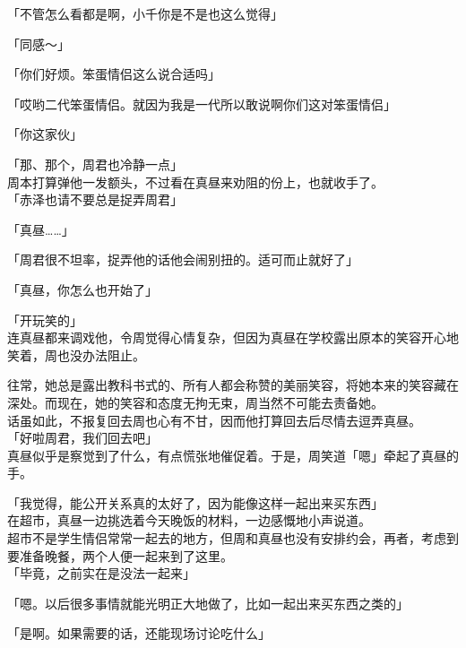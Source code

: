 「不管怎么看都是啊，小千你是不是也这么觉得」

「同感～」

「你们好烦。笨蛋情侣这么说合适吗」

「哎哟二代笨蛋情侣。就因为我是一代所以敢说啊你们这对笨蛋情侣」

「你这家伙」

「那、那个，周君也冷静一点」\\

周本打算弹他一发额头，不过看在真昼来劝阻的份上，也就收手了。\\

「赤泽也请不要总是捉弄周君」

「真昼……」

「周君很不坦率，捉弄他的话他会闹别扭的。适可而止就好了」

「真昼，你怎么也开始了」

「开玩笑的」\\

连真昼都来调戏他，令周觉得心情复杂，但因为真昼在学校露出原本的笑容开心地笑着，周也没办法阻止。

往常，她总是露出教科书式的、所有人都会称赞的美丽笑容，将她本来的笑容藏在深处。而现在，她的笑容和态度无拘无束，周当然不可能去责备她。\\

话虽如此，不报复回去周也心有不甘，因而他打算回去后尽情去逗弄真昼。\\

「好啦周君，我们回去吧」\\

真昼似乎是察觉到了什么，有点慌张地催促着。于是，周笑道「嗯」牵起了真昼的手。\\

\vspace{2\baselineskip}

「我觉得，能公开关系真的太好了，因为能像这样一起出来买东西」\\

在超市，真昼一边挑选着今天晚饭的材料，一边感慨地小声说道。\\

超市不是学生情侣常常一起去的地方，但周和真昼也没有安排约会，再者，考虑到要准备晚餐，两个人便一起来到了这里。\\

「毕竟，之前实在是没法一起来」

「嗯。以后很多事情就能光明正大地做了，比如一起出来买东西之类的」

「是啊。如果需要的话，还能现场讨论吃什么」

